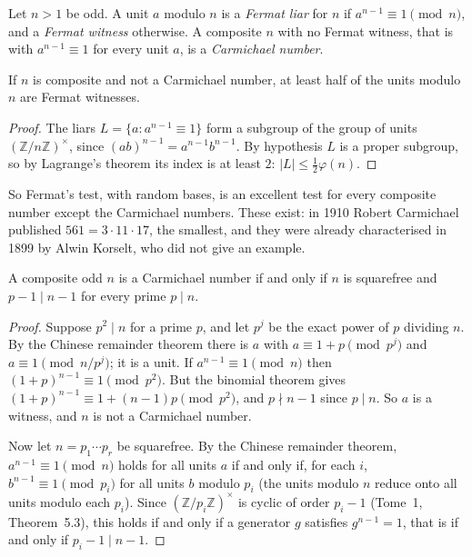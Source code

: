 \begin{definition}
Let $n>1$ be odd. A unit $a$ modulo $n$ is a \emph{Fermat liar} for $n$ if $a^{n-1}\equiv1\pmod n$, and a \emph{Fermat witness} otherwise. A composite $n$ with no Fermat witness, that is with $a^{n-1}\equiv1$ for every unit $a$, is a \emph{Carmichael number}.
\end{definition}

\begin{proposition}\label{prop:fermathalf}
If $n$ is composite and not a Carmichael number, at least half of the units modulo $n$ are Fermat witnesses.
\end{proposition}
\begin{proof}
The liars $L=\{a:a^{n-1}\equiv1\}$ form a subgroup of the group of units $(\mathbb Z/n\mathbb Z)^\times$, since $(ab)^{n-1}=a^{n-1}b^{n-1}$. By hypothesis $L$ is a proper subgroup, so by Lagrange's theorem its index is at least $2$: $|L|\le\frac12\varphi(n)$.
\end{proof}

So Fermat's test, with random bases, is an excellent test for every composite number except the Carmichael numbers. These exist: in 1910 Robert Carmichael published $561=3\cdot11\cdot17$, the smallest, and they were already characterised in 1899 by Alwin Korselt, who did not give an example.

\begin{theorem}\label{thm:korselt}
A composite odd $n$ is a Carmichael number if and only if $n$ is squarefree and $p-1\mid n-1$ for every prime $p\mid n$.
\end{theorem}
\begin{proof}
Suppose $p^2\mid n$ for a prime $p$, and let $p^j$ be the exact power of $p$ dividing $n$. By the Chinese remainder theorem there is $a$ with $a\equiv1+p\pmod{p^j}$ and $a\equiv1\pmod{n/p^j}$; it is a unit. If $a^{n-1}\equiv1\pmod n$ then $(1+p)^{n-1}\equiv1\pmod{p^2}$. But the binomial theorem gives $(1+p)^{n-1}\equiv1+(n-1)p\pmod{p^2}$,
and $p\nmid n-1$ since $p\mid n$. So $a$ is a witness, and $n$ is not a Carmichael number.

Now let $n=p_1\cdots p_r$ be squarefree. By the Chinese remainder theorem, $a^{n-1}\equiv1\pmod n$ holds for all units $a$ if and only if, for each $i$, $b^{n-1}\equiv1\pmod{p_i}$ for all units $b$ modulo $p_i$ (the units modulo $n$ reduce onto all units modulo each $p_i$). Since $(\mathbb Z/p_i\mathbb Z)^\times$ is cyclic of order $p_i-1$ (Tome~1, Theorem~5.3), this holds if and only if a generator $g$ satisfies $g^{n-1}=1$, that is if and only if $p_i-1\mid n-1$.
\end{proof}


